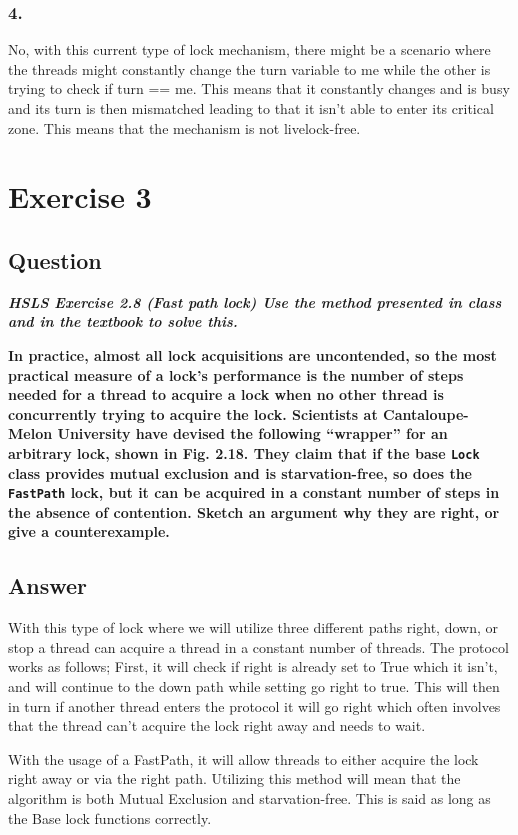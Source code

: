 \documentclass{article}
\begin{document}
\subsubsection*{4.}
No, with this current type of lock mechanism, there might be a scenario where the threads might constantly change the turn variable to me while the other is trying to check if turn == me. This means that it constantly changes and is busy and its turn is then mismatched leading to that it isn't able to enter its critical zone. This means that the mechanism is not livelock-free.



\section*{Exercise 3}
\subsection*{Question}
\textbf{\textit{HSLS Exercise 2.8 (Fast path lock) Use the method presented in class and in the textbook to solve this.}}

\textbf{In practice, almost all lock acquisitions are uncontended, so the most practical measure of a lock’s performance is the number of steps needed for a thread to acquire a lock when no other thread is concurrently trying to acquire the lock. Scientists at Cantaloupe-Melon University have devised the following “wrapper” for an arbitrary lock, shown in Fig. 2.18. They claim that if the base \texttt{Lock} class provides mutual exclusion and is starvation-free, so does the \texttt{FastPath} lock, but it can be acquired in a constant number of steps in the absence of contention. Sketch an argument why they are right, or give a counterexample.}

\subsection*{Answer}
With this type of lock where we will utilize three different paths right, down, or stop a thread can acquire a thread in a constant number of threads. The protocol works as follows; First, it will check if right is already set to True which it isn't, and will continue to the down path while setting go right to true. This will then in turn if another thread enters the protocol it will go right which often involves that the thread can't acquire the lock right away and needs to wait.

With the usage of a FastPath, it will allow threads to either acquire the lock right away or via the right path. Utilizing this method will mean that the algorithm is both Mutual Exclusion and starvation-free. This is said as long as the Base lock functions correctly.


\newpage
\printbibliography
\end{document}
